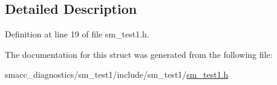 \subsection{Detailed Description}


Definition at line 19 of file sm\+\_\+test1.\+h.



The documentation for this struct was generated from the following file\+:\begin{DoxyCompactItemize}
\item 
smacc\+\_\+diagnostics/sm\+\_\+test1/include/sm\+\_\+test1/\hyperlink{sm__test1_8h}{sm\+\_\+test1.\+h}\end{DoxyCompactItemize}
